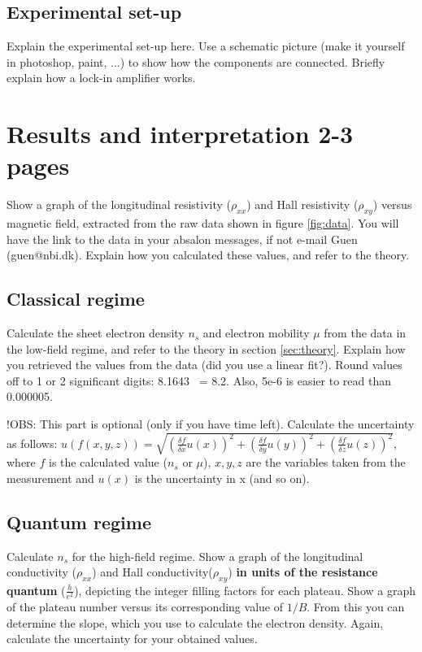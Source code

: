 \documentclass[a4paper]{article}
\begin{document}
\subsection{Experimental set-up}
Explain the experimental set-up here. Use a schematic picture (make it yourself in photoshop, paint, ...) to show how the components are connected. Briefly explain how a lock-in amplifier works.

\section{Results and interpretation 2-3 pages}
Show a graph of the longitudinal resistivity ($\rho_{xx}$) and Hall resistivity ($\rho_{xy}$) versus magnetic field, extracted from the raw data shown in figure \ref{fig:data}. You will have the link to the data in your absalon messages, if not e-mail Guen (guen@nbi.dk). Explain how you calculated these values, and refer to the theory.


\subsection{Classical regime}
Calculate the sheet electron density $n_{s}$ and electron mobility $\mu$ from the data in the low-field regime, and refer to the theory in section \ref{sec:theory}. Explain how you retrieved the values from the data (did you use a linear fit?).
Round values off to 1 or 2 significant digits: 8.1643 ~= 8.2. Also, 5e-6 is easier to read than 0.000005.

!OBS: This part is optional (only if you have time left).
Calculate the uncertainty as follows: \newline $u(f(x, y, z)) = \sqrt{(\frac{\delta f}{\delta{x}} u(x))^{2} + (\frac{\delta f}{\delta{y}} u(y))^{2} + (\frac{\delta f}{\delta{z}} u(z))^{2}}$, where $f$ is the calculated value ($n_{s}$ or $\mu$), $x, y, z$ are the variables taken from the measurement and $u(x)$ is the uncertainty in x (and so on).

\subsection{Quantum regime}
Calculate $n_{s}$ for the high-field regime.
Show a graph of the longitudinal conductivity ($\rho_{xx}$) and Hall conductivity($\rho_{xy}$) \textbf{in units of the resistance quantum} ($\frac{h}{e^{2}}$), depicting the integer filling factors for each plateau.
Show a graph of the plateau number versus its corresponding value of $1/B$. From this you can determine the slope, which you use to calculate the electron density.
Again, calculate the uncertainty for your obtained values.
\end{document}
